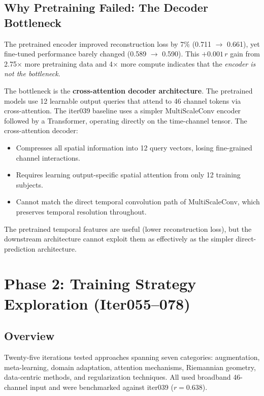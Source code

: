 \documentclass[11pt,a4paper]{article}
\begin{document}
\subsection{Why Pretraining Failed: The Decoder Bottleneck}

The pretrained encoder improved reconstruction loss by 7\% (0.711
$\to$ 0.661), yet fine-tuned performance barely changed (0.589 $\to$
0.590). This $+0.001\,r$ gain from 2.75$\times$ more pretraining data
and 4$\times$ more compute indicates that the \emph{encoder is not the
bottleneck}.

The bottleneck is the \textbf{cross-attention decoder architecture}. The
pretrained models use 12 learnable output queries that attend to 46 channel
tokens via cross-attention. The iter039 baseline uses a simpler
MultiScaleConv encoder followed by a Transformer, operating directly on
the time-channel tensor. The cross-attention decoder:

\begin{itemize}
  \item Compresses all spatial information into 12 query vectors, losing
    fine-grained channel interactions.
  \item Requires learning output-specific spatial attention from only 12
    training subjects.
  \item Cannot match the direct temporal convolution path of MultiScaleConv,
    which preserves temporal resolution throughout.
\end{itemize}

The pretrained temporal features are useful (lower reconstruction loss),
but the downstream architecture cannot exploit them as effectively as the
simpler direct-prediction architecture.

\section{Phase 2: Training Strategy Exploration (Iter055--078)}
\label{sec:strategies}

\subsection{Overview}

Twenty-five iterations tested approaches spanning seven categories:
augmentation, meta-learning, domain adaptation, attention mechanisms,
Riemannian geometry, data-centric methods, and regularization techniques.
All used broadband 46-channel input and were benchmarked against iter039
($r = 0.638$).
\end{document}
